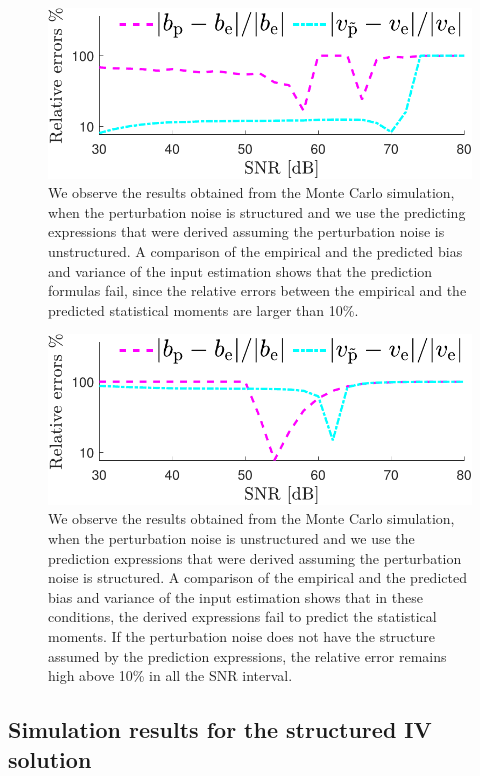 \begin{figure}[!htpb]
  \centering
  \includegraphics[width=0.69\columnwidth]{./ChapterStatisticalAnalysis/fig/Fig_12.pdf}
  \caption{\label{fig:unstrFormula_strData} \color{blue} We observe the results obtained from the Monte Carlo simulation, when the perturbation noise is structured and we use the predicting expressions that were derived assuming the perturbation noise is unstructured. A comparison of the empirical and the predicted bias and variance of the input estimation shows that the prediction formulas fail, since the relative errors between the empirical and the predicted statistical moments are larger than 10\%.}
\end{figure}

\begin{figure}[!htpb]
  \centering
  \includegraphics[width=0.69\columnwidth]{./ChapterStatisticalAnalysis/fig/Fig_13.pdf}
  \caption{\label{fig:strFormula_unstrData} \color{blue} We observe the results obtained from the Monte Carlo simulation, when the perturbation noise is unstructured and we use the prediction expressions that were derived assuming the perturbation noise is structured. A comparison of the empirical and the predicted bias and variance of the input estimation shows that in these conditions, the derived expressions fail to predict the statistical moments. If the perturbation noise does not have the structure assumed by the prediction expressions, the relative error remains high above 10\% in all the SNR interval. }
\end{figure}



\subsection{Simulation results for the structured IV solution}

